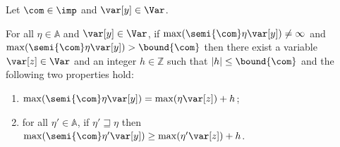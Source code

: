 \begin{lemma}
  \label{le:inc}
  Let \(\com\in \imp\) and \(\var[y] \in \Var\).
  
  \noindent
  For all \(\eta \in \mathbb{A}\) and \(\var[y] \in \Var\), if
  \(\max(\semi{\com} \eta \var[y]) \neq \infty\) and
  \(\max(\semi{\com}\eta \var[y]) > \bound{\com}\) then there exist a
  variable \(\var[z] \in \Var\) and an integer \(h \in \mathbb{Z}\) such
  that \(|h| \leq \bound{\com}\) and the following two properties hold:
  \begin{enumerate}[label=\roman*]
  \item \(\max(\semi{\com}\eta \var[y]) = \max(\eta \var[z]) + h\); \label{point1}
  \item  for all \(\eta' \in \mathbb{A}\), if \(\eta' \sqsupseteq \eta\)
    then
    \(\max(\semi{\com}\eta' \var[y]) \geq \max(\eta' \var[z]) + h\). \label{point2}
  \end{enumerate}
\end{lemma}

